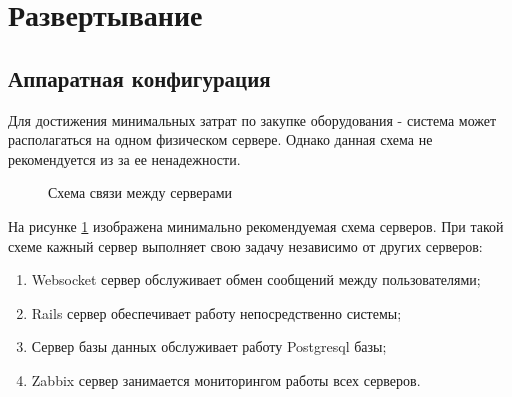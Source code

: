 \newpage
\section{Развертывание}
\subsection{Аппаратная конфигурация}
Для достижения минимальных затрат по закупке оборудования - система может
располагаться на одном физическом сервере. Однако данная схема не рекомендуется
из за ее ненадежности.

\begin{figure}[h]
\caption{Схема связи между серверами}
\label{ris:hardware_configuration}
\end{figure}

На рисунке \ref{ris:hardware_configuration} изображена минимально рекомендуемая
схема серверов. При такой схеме кажный сервер выполняет свою задачу независимо
от других серверов:
\begin{enumerate}
  \item Websocket сервер обслуживает обмен сообщений между пользователями;
  \item Rails сервер обеспечивает работу непосредственно системы;
  \item Сервер базы данных обслуживает работу Postgresql базы;
  \item Zabbix сервер занимается мониторингом работы всех серверов.
\end{enumerate}






